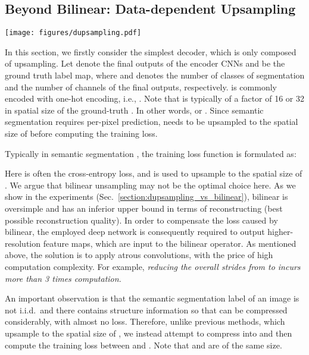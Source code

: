 \documentclass[10pt,twocolumn,letterpaper]{article}
\newcommand{\1}{{\mathbbm{1}}}
\begin{document}
\subsection{Beyond Bilinear: Data-dependent Upsampling} \label{section:dupsampling}
\begin{figure*}[t]
  \centering
  \texttt{[image: figures/dupsampling.pdf]}
  \caption{The proposed DUpsampling. In the figure, DUpsampling is used to upsample the CNNs outputs   by twice.  denotes the resulting maps. , computed with the method described in Sec.~\ref{section:dupsampling}, is the inverse projection matrix of DUpsampling. In practice, the upsampling ratio is typically 16 or 32.}
  \vspace{-0.2cm}
  \label{fig:dupsampling}
  \vspace{-0.2cm}
\end{figure*}
In this section, we firstly consider the simplest decoder, which is only composed of upsampling. Let  denote the final outputs of the encoder CNNs and  be the ground truth label map, where  and  denotes the number of classes of segmentation and the number of channels of the final outputs, respectively.
 is commonly encoded with one-hot encoding, i.e., . Note that  is typically of a factor of  16 or 32  in spatial size of the  ground-truth .  In other words,  or . Since semantic segmentation requires per-pixel prediction,  needs to be upsampled to the spatial size of  before computing the training loss.

Typically in semantic segmentation  \cite{chen2017rethinking, chen2018encoder, long2015fully, zhang2018context, he2019knowledge}, the training loss function is formulated as:

Here  is often the cross-entropy loss,  and 
is used to upsample  to the spatial size of .
We argue that bilinear unsampling may not be the optimal choice here.
As we  show in the experiments (Sec.~\ref{section:dupsampling_vs_bilinear}), bilinear is oversimple and has an inferior  upper bound in terms of  reconstructing (best possible reconstruction quality). In order to
compensate
the loss caused by bilinear, the employed deep network is consequently required to
output  higher-resolution feature maps, which are input to the bilinear operator.
As mentioned above, the solution is to apply atrous convolutions, with the price of high computation complexity.
For example, {\em  reducing the overall strides from  to  incurs more than 3 times computation.}

An important observation is that the semantic segmentation label 
of an image is not i.i.d.\ and there contains structure information
so that  can be compressed considerably, with almost no loss.
Therefore, unlike  previous methods, which upsample  to the spatial size of , we instead attempt to compress  into  and then compute the training loss between  and . Note that  and  are of  the same  size.
\end{document}

